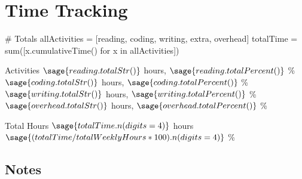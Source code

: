\documentclass[weekly_log.tex]{subfiles}
\begin{document}

\clearpage
\section{Time Tracking}
\begin{sagesilent}
   
   # Totals
   allActivities = [reading, coding, writing, extra, overhead]
   totalTime = sum([x.cumulativeTime() for x in allActivities])
\end{sagesilent}




\begin{timebox}{Activities}
             {$\sage{reading.totalStr()}$ hours,
                              $\sage{reading.totalPercent()}$ \%}
             {$\sage{coding.totalStr()}$ hours,
                              $\sage{coding.totalPercent()}$ \%}
             {$\sage{writing.totalStr()}$ hours,
                                $\sage{writing.totalPercent()}$ \%}
             {$\sage{overhead.totalStr()}$ hours,
                              $\sage{overhead.totalPercent()}$ \%}
 \end{timebox}
 
 
 
 \begin{timebox}{Total Hours}
       {$\sage{totalTime.n(digits=4)}$ hours}
     {$\sage{(totalTime / totalWeeklyHours * 100).n(digits=4)}$ \%}
 \end{timebox}
  
  


\subsection{Notes}

\bib{}
\end{document}
